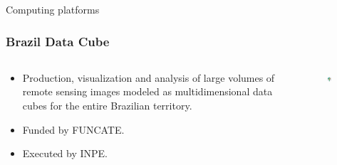 \documentclass[aspectratio=169]{beamer}
\begin{document}
\begin{frame}
    Computing platforms
\end{frame}



\begin{frame}
    \frametitle{Brazil Data Cube}
    \begin{columns}
        \begin{column}{0.5\textwidth}
            \begin{itemize}
                \item Production, visualization and analysis of large volumes 
                    of remote sensing images modeled as multidimensional data 
                    cubes for the entire Brazilian territory.
                \item Funded by FUNCATE. 
                \item Executed by INPE.
            \end{itemize}
        \end{column}
        \begin{column}{0.5\textwidth}
            \begin{figure}
                \centering
                \includegraphics[width=0.5\textwidth]
                {img/brazil_data_cube_logo.png}
                \caption{}
                \label{}
            \end{figure}
        \end{column}
    \end{columns}
\end{frame}
\end{document}
